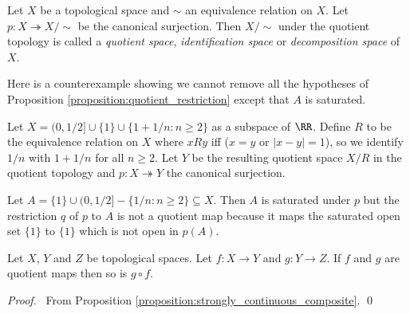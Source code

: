 \begin{definition}
    Let $X$ be a topological space and $\sim$ an equivalence relation on $X$. Let $p : X \twoheadrightarrow X / \sim$ be the canonical surjection.
    Then $X / \sim$ under the quotient topology is called a \emph{quotient space}, \emph{identification space} or \emph{decomposition space} of $X$.
\end{definition}

Here is a counterexample showing we cannot remove all the hypotheses of
Proposition \ref{proposition:quotient_restriction} except that $A$ is saturated.

\begin{example}
    \label{example:quotient_restriction}
    Let $X=(0,1/2] \cup \{1\} \cup \{1+1/n:n \geq 2\}$ as a subspace of $\RR$. 
    Define $R$ to be the equivalence relation on $X$ where $xRy$ iff 
    ($x=y$ or $|x - y|=1$), so we identify $1/n$ with $1+1/n$ for all $n \geq 2$. 
    Let $Y$ be the resulting quotient space $X/R$ in the quotient topology
    and $p : X \twoheadrightarrow Y$ the canonical surjection.
    
    Let $A=\{1\} \cup (0 ,1/2] - \{1/n:n \geq 2\} \subseteq X$.
    Then $A$ is saturated under $p$ but the restriction $q$ of $p$ to $A$
    is not a quotient map because it maps the saturated open set $\{1\}$
    to $\{1\}$ which is not open in $p(A)$.
\end{example}

\begin{proposition}
    Let $X$, $Y$ and $Z$ be topological spaces. Let $f : X \rightarrow Y$ and $g : Y \rightarrow Z$. If $f$ and $g$ are quotient maps then so is $g \circ f$.
\end{proposition}

\begin{proof}
    \pf\ From Proposition \ref{proposition:strongly_continuous_composite}. \qed
\end{proof}

